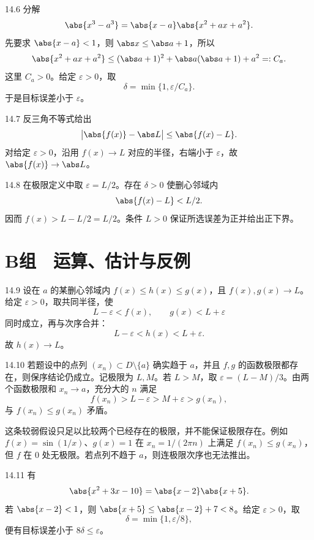 \begin{solution}{14.6}
分解
\[
 \abs{x^3-a^3}=\abs{x-a}\abs{x^2+ax+a^2}.
\]
先要求 \(\abs{x-a}<1\)，则 \(\abs x\le\abs a+1\)，所以
\[
 \abs{x^2+ax+a^2}
 \le(\abs a+1)^2+\abs a(\abs a+1)+a^2=:C_a.
\]
这里 \(C_a>0\)。给定 \(\varepsilon>0\)，取
\[
 \delta=\min\{1,\varepsilon/C_a\}.
\]
于是目标误差小于 \(\varepsilon\)。
\end{solution}

\begin{solution}{14.7}
反三角不等式给出
\[
 \bigl|\abs{f(x)}-\abs L\bigr|\le\abs{f(x)-L}.
\]
对给定 \(\varepsilon>0\)，沿用 \(f(x)\to L\) 对应的半径，右端小于 \(\varepsilon\)，故 \(\abs{f(x)}\to\abs L\)。
\end{solution}

\begin{solution}{14.8}
在极限定义中取 \(\varepsilon=L/2\)。存在 \(\delta>0\) 使删心邻域内
\[
 \abs{f(x)-L}<L/2.
\]
因而 \(f(x)>L-L/2=L/2\)。条件 \(L>0\) 保证所选误差为正并给出正下界。
\end{solution}

\section*{B组　运算、估计与反例}

\begin{solution}{14.9}
设在 \(a\) 的某删心邻域内 \(f(x)\le h(x)\le g(x)\)，且 \(f(x),g(x)\to L\)。给定 \(\varepsilon>0\)，取共同半径，使
\[
 L-\varepsilon<f(x),\qquad g(x)<L+\varepsilon
\]
同时成立，再与次序合并：
\[
 L-\varepsilon<h(x)<L+\varepsilon.
\]
故 \(h(x)\to L\)。
\end{solution}

\begin{solution}{14.10}
若题设中的点列 \((x_n)\subset D\setminus\{a\}\) 确实趋于 \(a\)，并且 \(f,g\) 的函数极限都存在，则保序结论仍成立。记极限为 \(L,M\)。若 \(L>M\)，取 \(\varepsilon=(L-M)/3\)。由两个函数极限和 \(x_n\to a\)，充分大的 \(n\) 满足
\[
 f(x_n)>L-\varepsilon>M+\varepsilon>g(x_n),
\]
与 \(f(x_n)\le g(x_n)\) 矛盾。

这条较弱假设只足以比较两个已经存在的极限，并不能保证极限存在。例如 \(f(x)=\sin(1/x)\)、\(g(x)=1\) 在 \(x_n=1/(2\pi n)\) 上满足 \(f(x_n)\le g(x_n)\)，但 \(f\) 在 \(0\) 处无极限。若点列不趋于 \(a\)，则连极限次序也无法推出。
\end{solution}

\begin{solution}{14.11}
有
\[
 \abs{x^2+3x-10}
 =\abs{x-2}\abs{x+5}.
\]
若 \(\abs{x-2}<1\)，则 \(\abs{x+5}\le\abs{x-2}+7<8\)。给定 \(\varepsilon>0\)，取
\[
 \delta=\min\{1,\varepsilon/8\},
\]
便有目标误差小于 \(8\delta\le\varepsilon\)。
\end{solution}

